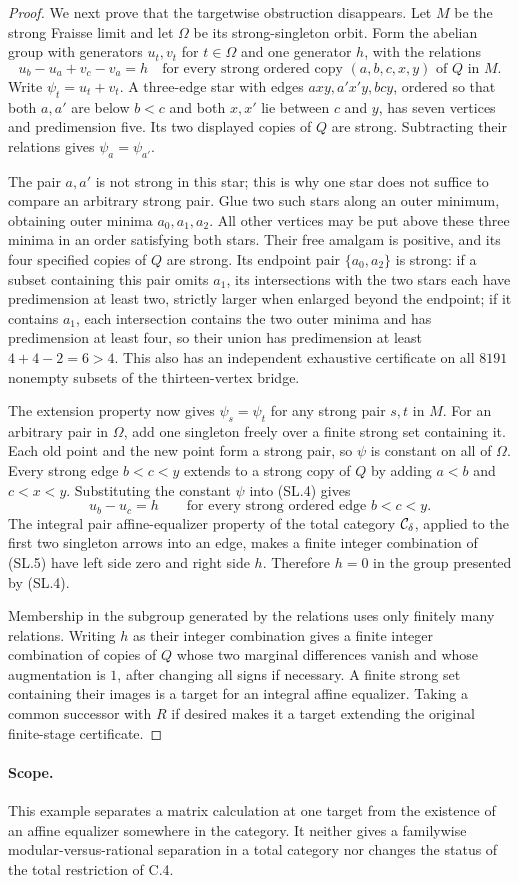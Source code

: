\begin{proof}
We next prove that the targetwise obstruction disappears.
Let $M$ be the strong Fraisse limit and let $\Omega$ be
its strong-singleton orbit. Form the abelian group with
generators $u_t,v_t$ for $t\in\Omega$ and one generator
$h$, with the relations
\[
 u_b-u_a+v_c-v_a=h
 \quad\text{for every strong ordered copy }(a,b,c,x,y)
       \text{ of }Q\text{ in }M.
 \tag{SL.4}
\]
Write $\psi_t=u_t+v_t$. A three-edge star with edges
$axy,a'x'y,bcy$, ordered so that both $a,a'$ are below
$b<c$ and both $x,x'$ lie between $c$ and $y$, has
seven vertices and predimension five. Its two displayed
copies of $Q$ are strong. Subtracting their relations
gives $\psi_a=\psi_{a'}$.

The pair $a,a'$ is not strong in this star; this is why
one star does not suffice to compare an arbitrary strong
pair. Glue two such stars along an outer minimum, obtaining
outer minima $a_0,a_1,a_2$. All other vertices may be put
above these three minima in an order satisfying both
stars. Their free amalgam is positive, and its four
specified copies of $Q$ are strong. Its endpoint pair
$\{a_0,a_2\}$ is strong: if a subset containing this pair
omits $a_1$, its intersections with the two stars each
have predimension at least two, strictly larger when
enlarged beyond the endpoint; if it contains $a_1$, each
intersection contains the two outer minima and has
predimension at least four, so their union has
predimension at least $4+4-2=6>4$. This also has an
independent exhaustive certificate on all $8191$ nonempty
subsets of the thirteen-vertex bridge.

The extension property now gives $\psi_s=\psi_t$ for any
strong pair $s,t$ in $M$. For an arbitrary pair in
$\Omega$, add one singleton freely over a finite strong
set containing it. Each old point and the new point form
a strong pair, so $\psi$ is constant on all of $\Omega$.
Every strong edge $b<c<y$ extends to a strong copy of $Q$
by adding $a<b$ and $c<x<y$. Substituting the constant
$\psi$ into (SL.4) gives
\[
 u_b-u_c=h\qquad\text{for every strong ordered edge }b<c<y.
 \tag{SL.5}
\]
The integral pair affine-equalizer property of the total
category $\mathcal C_\delta$, applied to the first two singleton
arrows into an edge, makes a finite integer combination
of (SL.5) have left side zero and right side $h$.
Therefore $h=0$ in the group presented by (SL.4).

Membership in the subgroup generated by the relations
uses only finitely many relations. Writing $h$ as their
integer combination gives a finite integer combination
of copies of $Q$ whose two marginal differences vanish
and whose augmentation is $1$, after changing all signs
if necessary. A finite strong set containing their images
is a target for an integral affine equalizer. Taking a
common successor with $R$ if desired makes it a target
extending the original finite-stage certificate.
\end{proof}

\paragraph{Scope.}
This example separates a matrix calculation at one target
from the existence of an affine equalizer somewhere in the
category. It neither gives a familywise modular-versus-rational
separation in a total category nor changes the status of
the total restriction of C.4.

